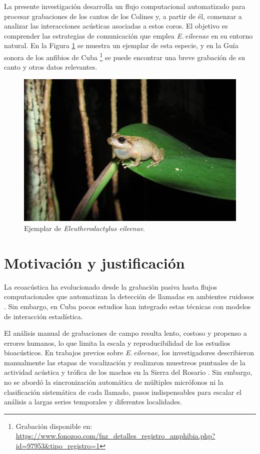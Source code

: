 La presente investigación desarrolla un flujo computacional automatizado para 
procesar grabaciones de los cantos de los Colines y, a partir de él, comenzar a analizar 
 las interacciones acústicas asociadas a estos coros. 
El objetivo es comprender las 
estrategias de comunicación que emplea \emph{E.\,eileenae} en su entorno natural.
En la Figura \ref{fig:colin} se muestra un ejemplar de esta especie, y en la
Guía sonora de los anfibios de Cuba 
\footnote{Grabación disponible en: \url{https://www.fonozoo.com/fnz_detalles_registro_amphibia.php?id=97953&tipo_registro=1}}
se puede encontrar una breve grabación de su canto y otros datos relevantes.\\

\begin{figure}[h!]
    \centering
    \includegraphics[width=\columnwidth]{Graphics/colin.jpg}
    \caption{Ejemplar de \emph{Eleutherodactylus eileenae}.}
    \label{fig:colin}
\end{figure}


\section{Motivación y justificación}
\label{sec:motivacion_justificacion}

La ecoacústica ha evolucionado desde la grabación pasiva hasta flujos computacionales 
que automatizan la detección de llamadas en ambientes ruidosos 
\cite{acevedo2009automated,blumstein2011acoustic}. Sin embargo, en Cuba pocos estudios 
han integrado estas técnicas con modelos de interacción estadística.

El análisis manual de grabaciones de campo resulta lento, 
costoso y propenso a errores humanos, lo que limita la escala y 
reproducibilidad de los estudios bioacústicos. En trabajos 
previos sobre \emph{E.\,eileenae}, los investigadores 
describieron manualmente las etapas de vocalización y 
realizaron muestreos puntuales de la actividad acústica y 
trófica de los machos en la Sierra del Rosario \cite{alonso2001patrones}. 
Sin embargo, no se abordó la sincronización automática de 
múltiples micrófonos ni la clasificación sistemática de cada 
llamado, pasos indispensables para escalar el análisis a largas 
series temporales y diferentes localidades.

